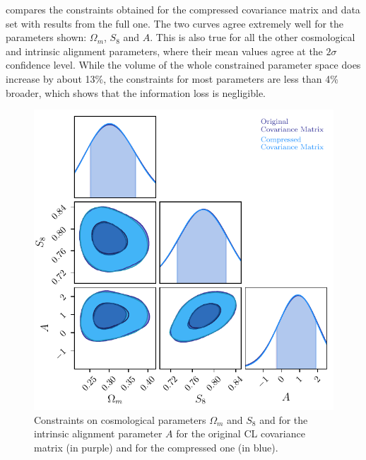 \documentclass[twocolumn]{\docclass}
\begin{document}
	
	
	 compares the constraints obtained for the compressed covariance matrix and data set with results from the full one. The two curves agree extremely well for the parameters shown: $\Omega_m$, $S_8$ and $A$. This is also true for all the other cosmological and intrinsic alignment parameters, where their mean values agree at the $2 \sigma$ confidence level. While the volume of the whole constrained parameter space does increase by about 13\%, the constraints for most parameters are less than 4\% broader, which shows that the information loss is negligible. 
	
	\begin{figure}
		\includegraphics[width=0.9\columnwidth]{Compression/Compressed_omS8A.pdf}
		\caption{Constraints on cosmological parameters $\Omega_m$ and $S_8$ and for the intrinsic alignment parameter $A$ for the original CL covariance matrix (in purple) and for the compressed one (in blue). \label{fig:compressiony1}}
	\end{figure}
	
\end{document}

